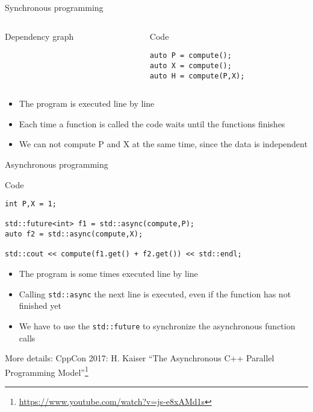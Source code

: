 \documentclass[12pt,t]{beamer}
\begin{document}
\begin{frame}[fragile]{Synchronous programming}


\begin{columns}[T]
\begin{column}{0.5\textwidth}
   \begin{block}{Dependency graph}
\begin{center}
\end{center}
\end{block}
\end{column}
\begin{column}{0.5\textwidth}  %
\begin{block}{Code}
\begin{lstlisting}
auto P = compute();
auto X = compute();
auto H = compute(P,X);
\end{lstlisting}
\end{block}
\end{column}
\end{columns}

\begin{itemize}
\item The program is executed line by line
\item Each time a function is called the code waits until the functions finishes
\item We can not compute P and X at the same time, since the data is independent
\end{itemize}
\end{frame}


\begin{frame}[fragile]{Asynchronous programming~\cite{williams2012c++} }
\begin{block}{Code}
\begin{lstlisting}
int P,X = 1;

std::future<int> f1 = std::async(compute,P);
auto f2 = std::async(compute,X);

std::cout << compute(f1.get() + f2.get()) << std::endl;
\end{lstlisting}
\end{block}

\begin{itemize}
\item The program is some times executed line by line
\item Calling \lstinline|std::async| the next line is executed, even if the function has not finished yet
\item We have to use the \lstinline|std::future| to synchronize the asynchronous function calls
\end{itemize}
\tiny More details: CppCon 2017: H. Kaiser “The Asynchronous C++ Parallel Programming Model”\footnote{\tiny\url{https://www.youtube.com/watch?v=js-e8xAMd1s}}
\end{frame}
\end{document}
